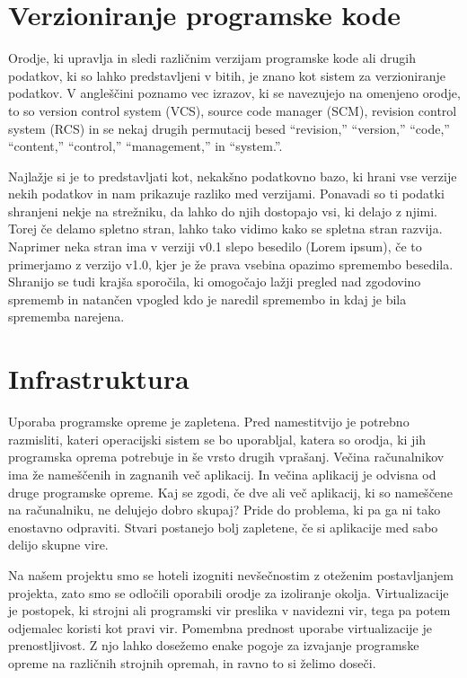 \documentclass[a4paper, 12pt]{book}
\begin{document}
\section{Verzioniranje programske kode}

Orodje, ki upravlja in sledi različnim verzijam programske kode ali drugih podatkov, ki so lahko predstavljeni v bitih, je znano kot sistem za verzioniranje podatkov. V angleščini poznamo vec izrazov, ki se navezujejo na omenjeno orodje, to so version control system (VCS), source code manager (SCM), revision control system (RCS) in se nekaj drugih permutacij besed “revision,” “version,” “code,” “content,” “control,” “management,” in “system.”.

Najlažje si je to predstavljati kot, nekakšno podatkovno bazo, ki hrani vse verzije nekih podatkov in nam prikazuje razliko med verzijami. Ponavadi so ti podatki shranjeni nekje na strežniku, da lahko do njih dostopajo vsi, ki delajo z njimi. Torej če delamo spletno stran, lahko tako vidimo kako se spletna stran razvija. Naprimer neka stran ima v verziji v0.1 slepo besedilo (Lorem ipsum), če to primerjamo z verzijo v1.0, kjer je že prava vsebina opazimo spremembo besedila. Shranijo se tudi krajša sporočila, ki omogočajo lažji pregled nad zgodovino sprememb in natančen vpogled kdo je naredil spremembo in kdaj je bila sprememba narejena.
\section{Infrastruktura}
Uporaba programske opreme je zapletena. Pred namestitvijo je potrebno razmisliti, kateri operacijski sistem se bo uporabljal, katera so orodja, ki jih programska oprema potrebuje in še vrsto drugih vprašanj. Večina računalnikov ima že nameščenih in zagnanih več aplikacij. In večina aplikacij je odvisna od druge programske opreme. Kaj se zgodi, če dve ali več aplikacij, ki so nameščene na računalniku, ne delujejo dobro skupaj? Pride do problema, ki pa ga ni tako enostavno odpraviti. Stvari postanejo bolj zapletene, če si aplikacije med sabo delijo skupne vire. 

Na našem projektu smo se hoteli izogniti nevšečnostim z oteženim postavljanjem projekta, zato smo se odločili oporabili orodje za izoliranje okolja. Virtualizacije je postopek, ki strojni ali programski vir preslika v navidezni vir, tega pa potem odjemalec koristi kot pravi vir. Pomembna prednost uporabe virtualizacije je prenostljivost. Z njo lahko dosežemo enake pogoje za izvajanje programske opreme na različnih strojnih opremah, in ravno to si želimo doseči.
\end{document}
